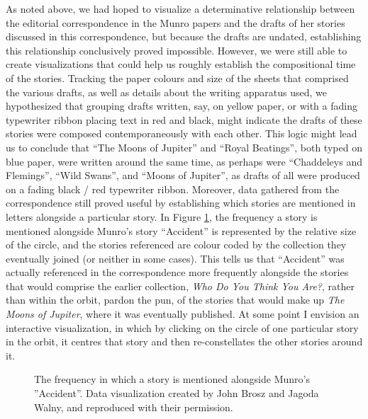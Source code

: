 \begin{paper}
As noted above, we had hoped to visualize a determinative relationship
between the editorial correspondence in the Munro papers and the drafts
of her stories discussed in this correspondence, but because the drafts
are undated, establishing this relationship conclusively proved
impossible. However, we were still able to create visualizations that
could help us roughly establish the compositional time of the stories.
Tracking the paper colours and size of the sheets that comprised the
various drafts, as well as details about the writing apparatus used, we
hypothesized that grouping drafts written, say, on yellow paper, or with
a fading typewriter ribbon placing text in red and black, might indicate
the drafts of these stories were composed contemporaneously with each
other. This logic might lead us to conclude that ``The Moons of
Jupiter'' and ``Royal Beatings'', both typed on blue paper, were written
around the same time, as perhaps were ``Chaddeleys and Flemings'',
``Wild Swans'', and ``Moons of Jupiter'', as drafts of all were produced
on a fading black / red typewriter ribbon. Moreover, data gathered from
the correspondence still proved useful by establishing which stories are
mentioned in letters alongside a particular story. In Figure \ref{fig:wiens5}, the
frequency a story is mentioned alongside Munro's story ``Accident'' is
represented by the relative size of the circle, and the stories
referenced are colour coded by the collection they eventually joined (or
neither in some cases). This tells us that ``Accident'' was actually
referenced in the correspondence more frequently alongside the stories
that would comprise the earlier collection, \emph{Who Do You Think You
Are?}, rather than within the orbit, pardon the pun, of the stories that
would make up \emph{The Moons of Jupiter}, where it was eventually
published. At some point I envision an interactive visualization, in
which by clicking on the circle of one particular story in the orbit, it
centres that story and then re-constellates the other stories around it.

\begin{figure}[t]
    \centering
    \caption{The frequency in which a story is mentioned alongside Munro's ''Accident''. Data visualization created by John Brosz and Jagoda Walny, and reproduced with their permission.}
    \label{fig:wiens5}
\end{figure}


\end{paper}
